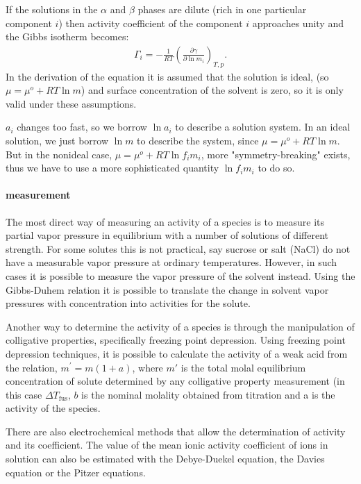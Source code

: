 If the solutions in the $\alpha$ and $\beta$ phases are dilute (rich in one particular component $i$) then activity coefficient 
of the component $i$ approaches unity and the Gibbs isotherm becomes:
\begin{eqnarray}
\Gamma_i = - \frac{1}{RT} \left( \frac{\partial \gamma}{\partial \ln m_i} \right)_{T,p}.
\label{6}
\end{eqnarray}
In the derivation of the equation it is assumed that the solution is ideal, (so $\mu = \mu^o + RT \ln m$) and surface concentration of the solvent is zero, so it is only valid under these assumptions.

$a_i$ changes too fast, so we borrow $\ln a_i$ to describe a solution system. In an ideal solution, we just borrow $\ln m$ to describe the system, since $\mu = \mu^o + RT \ln m$. But in the nonideal case, $\mu = \mu^o + RT \ln f_im_i$, more "symmetry-breaking" exists, thus we have to use a more sophisticated quantity $\ln f_im_i$ to do so.

\paragraph{measurement}
The most direct way of measuring an activity of a species is {to measure its partial vapor pressure} in equilibrium 
with a number of solutions of different strength. For some solutes this is not practical, say sucrose or salt (NaCl) 
do not have a measurable vapor pressure at ordinary temperatures. However, in such cases it is possible to measure 
the vapor pressure of the solvent instead. Using the Gibbs-Duhem relation it is possible to translate the change in 
solvent vapor pressures with concentration into activities for the solute.

Another way to determine the activity of a species is through the manipulation of colligative properties, 
specifically freezing point depression. Using freezing point depression techniques, it is possible to calculate the activity of a weak acid from the relation,
$m^{\prime} = m(1 + a)$,
where $m'$ is the total molal equilibrium concentration of solute determined by any colligative property measurement 
(in this case $\Delta{T_\text{fus}}$, $b$ is the nominal molality obtained from titration and a is the activity of the species.

There are also electrochemical methods that allow the determination of activity and its coefficient.
The value of the mean ionic activity coefficient of ions in solution can also be estimated with the Debye-Duekel equation, the Davies equation or the Pitzer equations.
